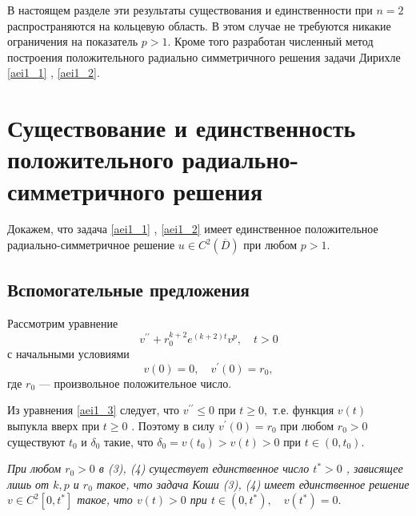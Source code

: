 В настоящем разделе эти результаты существования и единственности при $n=2$ распространяются на кольцевую область. В этом случае не требуются
никакие ограничения на показатель $ p>1 $. Кроме того разработан численный метод построения положительного радиально симметричного решения задачи Дирихле \eqref{aei1_1} 
, \eqref{aei1_2}.











\section{ Существование и единственность положительного радиально-симметричного решения}

Докажем, что задача \eqref{aei1_1}
, \eqref{aei1_2} имеет единственное положительное
радиально-симметричное решение $ u \in C^2(\overline {D}) $
при любом  $ p>1 $.

 \subsection{Вспомогательные предложения}

 Рассмотрим уравнение
\begin{equation}\label{aei1_3}
v^{\prime\prime}+r_0^{k+2}e^{(k+2)t}v^p, \quad t>0 
\end{equation}
с начальными условиями
\begin{equation}\label{aei1_4}
v(0)=0, \quad v^{\prime}(0)=r_0,
\end{equation}
где $ r_0$ --- произвольное положительное число.

Из уравнения \eqref{aei1_3} следует, что $ v^{\prime\prime} \leq 0 $
при $ t \geq 0, $  т.е. функция $ v(t) $  выпукла вверх
при $ t \geq 0 $ . Поэтому в силу $ v^{\prime}(0)=r_0 $
при любом $ r_0 >0 $  существуют $ t_0 $ и $ \delta_0 $
такие, что $ \delta_0=v(t_0)>v(t)>0 $  при $ t \in (0,t_0). $

\begin{lemma}\label{aeiR_1}
\textit{ При любом $ r_0>0 $  в (3), (4) существует
единственное число $ t^*>0 $  ,  зависящее лишь от $ k,p $ и
$ r_0 $   такое, что задача Коши (3), (4) имеет единственное
решение $ v \in C^2[0,t^*] $  такое, что $ v(t)>0 $  при
$ t \in (0,t^*), \quad v(t^*)=0. $ }
\end{lemma}
  

